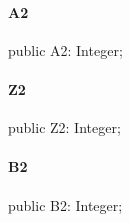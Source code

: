 \documentclass{report}
\begin{document}
\paragraph*{A2}\hspace*{\fill}

\begin{list}{}{
\setlength{\itemindent}{0cm}
\setlength{\listparindent}{0cm}
\setlength{\leftmargin}{\evensidemargin}
\addtolength{\leftmargin}{\tmplength}
\settowidth{\labelsep}{X}
\addtolength{\leftmargin}{\labelsep}
\setlength{\labelwidth}{\tmplength}
}
\begin{flushleft}
\item[\textbf{Declaration}\hfill]
\begin{ttfamily}
public A2: Integer;\end{ttfamily}


\end{flushleft}
\end{list}
\paragraph*{Z2}\hspace*{\fill}

\begin{list}{}{
\setlength{\itemindent}{0cm}
\setlength{\listparindent}{0cm}
\setlength{\leftmargin}{\evensidemargin}
\addtolength{\leftmargin}{\tmplength}
\settowidth{\labelsep}{X}
\addtolength{\leftmargin}{\labelsep}
\setlength{\labelwidth}{\tmplength}
}
\begin{flushleft}
\item[\textbf{Declaration}\hfill]
\begin{ttfamily}
public Z2: Integer;\end{ttfamily}


\end{flushleft}
\end{list}
\paragraph*{B2}\hspace*{\fill}

\begin{list}{}{
\setlength{\itemindent}{0cm}
\setlength{\listparindent}{0cm}
\setlength{\leftmargin}{\evensidemargin}
\addtolength{\leftmargin}{\tmplength}
\settowidth{\labelsep}{X}
\addtolength{\leftmargin}{\labelsep}
\setlength{\labelwidth}{\tmplength}
}
\begin{flushleft}
\item[\textbf{Declaration}\hfill]
\begin{ttfamily}
public B2: Integer;\end{ttfamily}


\end{flushleft}
\end{list}
\end{document}
